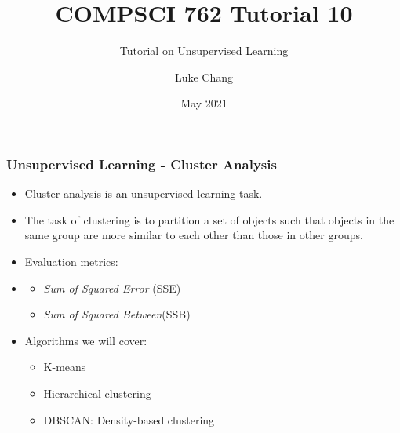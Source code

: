 \documentclass[aspectratio=169, 10pt]{beamer}
\title{COMPSCI 762 Tutorial 10}
\subtitle{Tutorial on Unsupervised Learning}
\author{Luke Chang}
\institute{The University of Auckland}
\date{May 2021}
\begin{document}
\frame{\titlepage}


        

\begin{frame}
\frametitle{Unsupervised Learning - Cluster Analysis}

\begin{itemize}
    \item Cluster analysis is an unsupervised learning task.
    \item The task of clustering is to partition a set of objects such that objects in the same group are more similar to each other than those in other groups.
    \item Evaluation metrics: 
    \item \begin{itemize}
        \item \textit{Sum of Squared Error} (SSE)
        \item \textit{Sum of Squared Between}(SSB)
    \end{itemize}
    \item Algorithms we will cover: 
        \begin{itemize}
            \item K-means
            \item Hierarchical clustering
            \item DBSCAN: Density-based clustering
        \end{itemize}
\end{itemize}

\end{frame}
\end{document}
